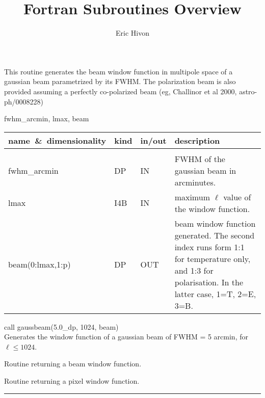 
\sloppy


\title{\healpix Fortran Subroutines Overview}
 \section[gaussbeam]{ }
\label{sub:gaussbeam}
\author{Eric Hivon}

\begin{facility}
{This routine generates the beam window function in multipole space of a
  gaussian beam parametrized by its FWHM. The
polarization beam is also provided assuming a perfectly
co-polarized beam (eg, Challinor et al 2000, astro-ph/0008228)}
{\modAlmTools}
\end{facility}

\begin{f90format}
{fwhm\_arcmin, lmax, beam}
\end{f90format}

\begin{arguments}
{
\begin{tabular}{p{0.35\hsize} p{0.05\hsize} p{0.05\hsize} p{0.45\hsize}} \hline  
\textbf{name~\&~dimensionality} & \textbf{kind} & \textbf{in/out} & \textbf{description} \\ \hline
                   &   &   &                           \\ %
fwhm\_arcmin & DP & IN & FWHM of the gaussian beam in arcminutes. \\
lmax & I4B & IN & maximum $\ell$ value of the window function.   \\
beam(0:lmax,1:p) & DP & OUT & beam window function generated. The second index runs form 1:1 for temperature only, and 1:3 for polarisation. In the latter case, 1=T, 2=E, 3=B.\\
\end{tabular}
}
\end{arguments}

\begin{example}
{
call gaussbeam(5.0\_dp, 1024, beam)  \\
}
{
Generates the window function of a gaussian beam of FWHM = 5 arcmin, for $\ell
\leq 1024$.
}
\end{example}


\begin{related}
  \begin{sulist}{} %
  \item[\htmlref{generate\_beam}{sub:generate_beam}] Routine returning a beam
  window function.
  \item[\htmlref{pixel\_window}{sub:pixel_window}] Routine returning a pixel
  window function.
  \end{sulist}
\end{related}

\rule{\hsize}{2mm}

\newpage
